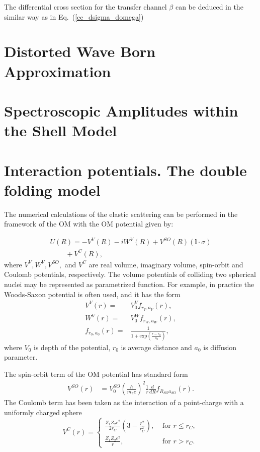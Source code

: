 \documentclass[
12pt, %
oneside, %
english, %
onehalfspacing, %
onehalfspacing, %
headsepline, %
]{MastersDoctoralThesis} %
\begin{document}
The differential cross section for the transfer channel $\beta$ can be deduced in the similar way as in Eq.~(\ref{cc_dsigma_domega})

\section{Distorted Wave Born Approximation}

\section{Spectroscopic Amplitudes within the Shell Model}

\section{Interaction potentials. The double folding model}

The numerical calculations  of the elastic scattering  can be performed in the framework of the OM with the OM potential given by:

\begin{equation}\label{eqn:OP}
\begin{array}{l}
 U(R)=-V^{V}(R)-iW^{V}(R)+V^{SO}(R)( \mathbf{l} \cdot \sigma )\\
~~~ ~~~~~~~+V^C(R),
\end{array}
\end{equation}
where $V^{V}, W^{V}, V^{SO},$ and $V^C$ are real volume,  imaginary volume, spin-orbit and Coulomb potentials, respectively. The volume potentials of colliding two spherical nuclei may be represented as parametrized function. For example, in practice the Woods-Saxon potential is often used, and it has the form
\begin{align}
V^V\left( r \right) = & V_0^V f_{r_V, a_V} \left( r \right), \nonumber \\
W^V\left( r \right) = & V_0^W f_{r_W, a_W} \left( r \right), \nonumber \\
f_{r_0, a_0} \left( r \right) = &  \frac{1}{1+ \text{exp} \left( \frac{r-r_0}{a_0} \right) },
\end{align}
where $V_0$ is depth of the potential, $r_0$ is  average distance and $a_0$ is  diffusion parameter. 

The spin-orbit term of the OM potential has standard form
\begin{eqnarray}
V^{SO}(r) &= V_0^{SO}\left(\frac{\hbar}{m_\pi c}\right)^2 \frac{1}{r} \frac{d}{dR} f_{R_{SO} a_{SO}}(r).
\end{eqnarray}
The Coulomb term has been taken as the interaction of a point-charge with a uniformly charged sphere
\[
\label{coul}
V^C(r)=
\begin{cases}
\frac{Z_1 Z_2 e^2}{2 r_C} \left( 3- \frac{r^2}{r_C^2} \right), &\text{  for } r \leq r_C, \\
\frac{Z_1 Z_2 e^2}{r}, & \text{ for } r > r_C .
\end{cases}
\]
\end{document}
